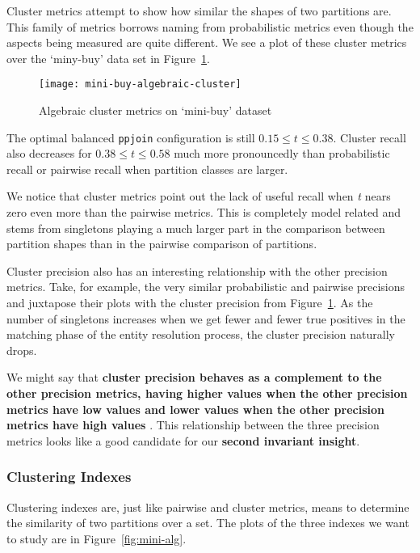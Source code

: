 Cluster metrics attempt to show how similar the shapes of two partitions are.
This family of metrics borrows naming from probabilistic metrics even though
the aspects being measured are quite different.
We see a plot of these cluster metrics over the `miny-buy' data set in
Figure~\ref{fig:mini-alg-cluster}.

\begin{figure}[htbp]
    \centering
    \captionsetup{justification=centering}
    \texttt{[image: mini-buy-algebraic-cluster]}
    \caption{Algebraic cluster metrics on `mini-buy' dataset}\label{fig:mini-alg-cluster}
\end{figure}

The optimal balanced \texttt{ppjoin} configuration is still $0.15 \le t \le 0.38$.
Cluster recall also decreases for $0.38 \le t \le 0.58$ much more pronouncedly
than probabilistic recall or pairwise recall when partition classes are larger.

We notice that cluster metrics point out the lack of useful recall when
\textit{t} nears zero even more than the pairwise metrics.
This is completely model related and stems from singletons playing a much larger
part in the comparison between partition shapes than in the pairwise comparison
of partitions.

Cluster precision also has an interesting relationship with the other precision
metrics.
Take, for example, the very similar probabilistic and pairwise precisions and
juxtapose their plots with the cluster precision from
Figure~\ref{fig:mini-alg-cluster}.
As the number of singletons increases when we get fewer and fewer true positives
in the matching phase of the entity resolution process, the cluster precision
naturally drops.

We might say that \textbf{
    cluster precision behaves as a complement to the other precision metrics,
    having higher values when the other precision metrics have low values and
    lower values when the other precision metrics have high values
}.
This relationship between the three precision metrics looks like a good
candidate for our \textbf{second invariant insight}.

\subsubsection{Clustering Indexes}\label{subsubsec:Clustering Indexes}

Clustering indexes are, just like pairwise and cluster metrics, means to
determine the similarity of two partitions over a set.
The plots of the three indexes we want to study are in Figure~\ref{fig:mini-alg}.

